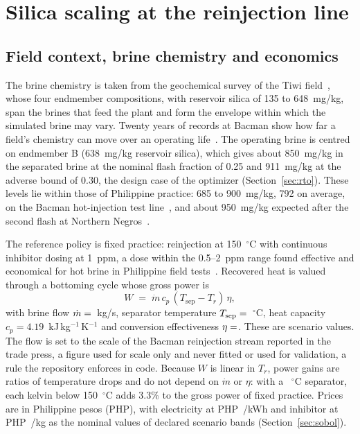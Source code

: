 \section{Silica scaling at the reinjection line}\label{sec:scaling}

\subsection{Field context, brine chemistry and economics}\label{sec:context}

The brine chemistry is taken from the geochemical survey of the Tiwi
field~\citep{sugiaman2004geochemical}, whose four endmember
compositions, with reservoir silica of 135 to 648~mg/kg, span the brines
that feed the plant and form the envelope within which the simulated
brine may vary. Twenty years of records at Bacman show how far a
field's chemistry can move over an operating
life~\citep{espartinez2015bacman}. The operating brine is centred on
endmember B (638~mg/kg reservoir silica), which gives about 850~mg/kg
in the separated brine at the nominal flash fraction of 0.25 and
911~mg/kg at the adverse bound of 0.30, the design case of the
optimizer (Section~\ref{sec:rto}). These levels lie within those of
Philippine practice: 685 to 900~mg/kg, 792 on average, on the Bacman
hot-injection test line~\citep{see2010wgc}, and about 950~mg/kg
expected after the second flash at Northern
Negros~\citep{remoroza2008ph}.

The reference policy is fixed practice: reinjection at
150~$^{\circ}$C with continuous inhibitor dosing at 1~ppm, a dose
within the 0.5--2~ppm range found effective and economical for hot
brine in Philippine field tests~\citep{baltazar2014grc}. Recovered heat
is valued through a bottoming cycle whose gross power is
\begin{equation}\label{eq:power}
W \;=\; \dot m\, c_p\, (T_{\mathrm{sep}} - T_r)\, \eta ,
\end{equation}
with brine flow $\dot m = \NUM{Mflow}$~kg/s, separator temperature
$T_{\mathrm{sep}} = \NUM{Tsep}$~$^{\circ}$C, heat capacity
$c_p = 4.19$~kJ\,kg$^{-1}$\,K$^{-1}$ and conversion effectiveness
$\eta = \NUM{EtaB}$. These are scenario values. The flow is set to the
scale of the Bacman reinjection stream reported in the trade press, a
figure used for scale only and never fitted or used for validation, a
rule the repository enforces in code. Because $W$ is linear in $T_r$,
power gains are ratios of temperature drops and do not depend on
$\dot m$ or $\eta$: with a ~$^{\circ}$C separator, each kelvin
below 150~$^{\circ}$C adds 3.3\% to the gross power of fixed practice.
Prices are in Philippine pesos (PHP), with electricity at
PHP~/kWh and inhibitor at PHP~/kg as the nominal
values of declared scenario bands (Section~\ref{sec:sobol}).


